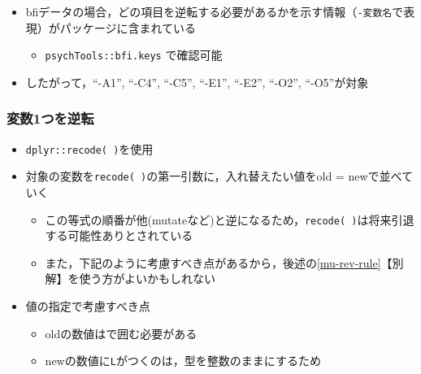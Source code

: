 \documentclass[
  xelatex,ja=standard, b5paper]{bxjsbook}
\providecommand{\tightlist}{%
  \setlength{\itemsep}{0pt}\setlength{\parskip}{0pt}}
\begin{document}
\begin{itemize}
\tightlist
\item
  bfiデータの場合，どの項目を逆転する必要があるかを示す情報（\texttt{-変数名}で表現）がパッケージに含まれている

  \begin{itemize}
  \tightlist
  \item
    \texttt{psychTools::bfi.keys} で確認可能
  \end{itemize}
\item
  したがって，``-A1'', ``-C4'', ``-C5'', ``-E1'', ``-E2'', ``-O2'', ``-O5''が対象
\end{itemize}

\hypertarget{mu-rev-recode1}{%
\subsubsection{変数1つを逆転}\label{mu-rev-recode1}}

\begin{itemize}
\tightlist
\item
  \texttt{dplyr::recode(\ )}を使用
\item
  対象の変数を\texttt{recode(\ )}の第一引数に，入れ替えたい値をold = newで並べていく

  \begin{itemize}
  \tightlist
  \item
    この等式の順番が他(mutateなど)と逆になるため，\texttt{recode(\ )}は将来引退する可能性ありとされている
  \item
    また，下記のように考慮すべき点があるから，後述の\ref{mu-rev-rule}【別解】を使う方がよいかもしれない
  \end{itemize}
\item
  値の指定で考慮すべき点

  \begin{itemize}
  \tightlist
  \item
    oldの数値は\texttt{}で囲む必要がある
  \item
    newの数値に\texttt{L}がつくのは，型を整数のままにするため
  \end{itemize}
\end{itemize}
\end{document}
